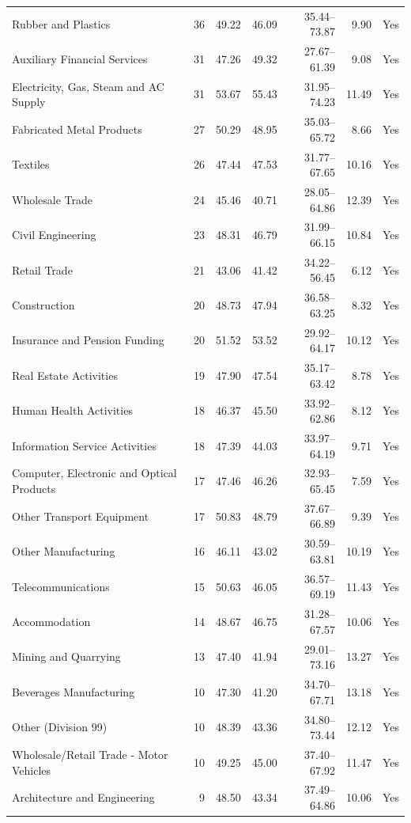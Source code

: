 \begin{table}[H]
\begin{singlepagetable}
\begin{tabular}{@{}L{6.0cm}rrrrrr@{}}
Rubber and Plastics & 36 & 49.22 & 46.09 & 35.44--73.87 & 9.90 & Yes \\
Auxiliary Financial Services & 31 & 47.26 & 49.32 & 27.67--61.39 & 9.08 & Yes \\
Electricity, Gas, Steam and AC Supply & 31 & 53.67 & 55.43 & 31.95--74.23 & 11.49 & Yes \\
Fabricated Metal Products & 27 & 50.29 & 48.95 & 35.03--65.72 & 8.66 & Yes \\
Textiles & 26 & 47.44 & 47.53 & 31.77--67.65 & 10.16 & Yes \\
Wholesale Trade & 24 & 45.46 & 40.71 & 28.05--64.86 & 12.39 & Yes \\
Civil Engineering & 23 & 48.31 & 46.79 & 31.99--66.15 & 10.84 & Yes \\
Retail Trade & 21 & 43.06 & 41.42 & 34.22--56.45 & 6.12 & Yes \\
Construction & 20 & 48.73 & 47.94 & 36.58--63.25 & 8.32 & Yes \\
Insurance and Pension Funding & 20 & 51.52 & 53.52 & 29.92--64.17 & 10.12 & Yes \\
Real Estate Activities & 19 & 47.90 & 47.54 & 35.17--63.42 & 8.78 & Yes \\
Human Health Activities & 18 & 46.37 & 45.50 & 33.92--62.86 & 8.12 & Yes \\
Information Service Activities & 18 & 47.39 & 44.03 & 33.97--64.19 & 9.71 & Yes \\
Computer, Electronic and Optical Products & 17 & 47.46 & 46.26 & 32.93--65.45 & 7.59 & Yes \\
Other Transport Equipment & 17 & 50.83 & 48.79 & 37.67--66.89 & 9.39 & Yes \\
Other Manufacturing & 16 & 46.11 & 43.02 & 30.59--63.81 & 10.19 & Yes \\
Telecommunications & 15 & 50.63 & 46.05 & 36.57--69.19 & 11.43 & Yes \\
Accommodation & 14 & 48.67 & 46.75 & 31.28--67.57 & 10.06 & Yes \\
Mining and Quarrying & 13 & 47.40 & 41.94 & 29.01--73.16 & 13.27 & Yes \\
Beverages Manufacturing & 10 & 47.30 & 41.20 & 34.70--67.71 & 13.18 & Yes \\
Other (Division 99) & 10 & 48.39 & 43.36 & 34.80--73.44 & 12.12 & Yes \\
Wholesale/Retail Trade - Motor Vehicles & 10 & 49.25 & 45.00 & 37.40--67.92 & 11.47 & Yes \\
Architecture and Engineering & 9 & 48.50 & 43.34 & 37.49--64.86 & 10.06 & Yes \\

\end{tabular}
\end{singlepagetable}
\end{table}
